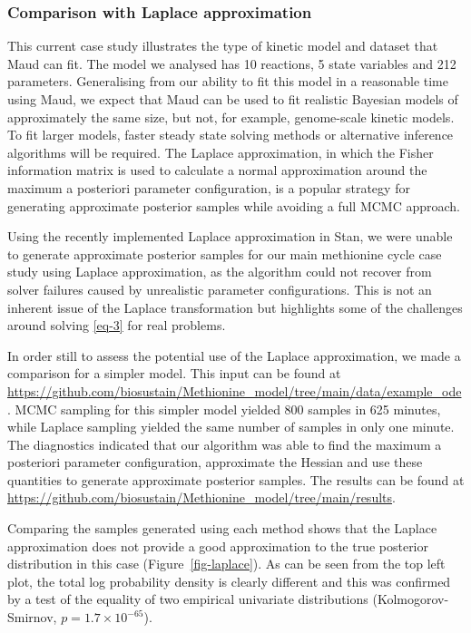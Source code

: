 \documentclass[journal=asbcd6,manuscript=article,layout=traditional]{achemso}
\begin{document}
\hypertarget{sec-laplace}{%
\subsubsection{Comparison with Laplace
approximation}\label{sec-laplace}}

This current case study illustrates the type of kinetic model and
dataset that Maud can fit. The model we analysed has 10 reactions, 5
state variables and 212 parameters. Generalising from our ability to fit
this model in a reasonable time using Maud, we expect that Maud can be
used to fit realistic Bayesian models of approximately the same size,
but not, for example, genome-scale kinetic models. To fit larger models,
faster steady state solving methods or alternative inference algorithms
will be required. The Laplace approximation, in which the Fisher
information matrix is used to calculate a normal approximation around
the maximum a posteriori parameter configuration, is a popular strategy
for generating approximate posterior samples while avoiding a full MCMC
approach.

Using the recently implemented Laplace approximation in Stan, we were
unable to generate approximate posterior samples for our main methionine
cycle case study using Laplace approximation, as the algorithm could not
recover from solver failures caused by unrealistic parameter
configurations. This is not an inherent issue of the Laplace
transformation but highlights some of the challenges around solving
\eqref{eq-3} for real problems.

In order still to assess the potential use of the Laplace approximation,
we made a comparison for a simpler model. This input can be found at
\url{https://github.com/biosustain/Methionine_model/tree/main/data/example_ode}.
MCMC sampling for this simpler model yielded 800 samples in 625 minutes,
while Laplace sampling yielded the same number of samples in only one
minute. The diagnostics indicated that our algorithm was able to find
the maximum a posteriori parameter configuration, approximate the
Hessian and use these quantities to generate approximate posterior
samples. The results can be found at
\url{https://github.com/biosustain/Methionine_model/tree/main/results}.

Comparing the samples generated using each method shows that the Laplace
approximation does not provide a good approximation to the true
posterior distribution in this case (Figure~\ref{fig-laplace}). As can
be seen from the top left plot, the total log probability density is
clearly different and this was confirmed by a test of the equality of
two empirical univariate distributions (Kolmogorov-Smirnov,
\(p=1.7\times10^{-65}\)).
\end{document}
